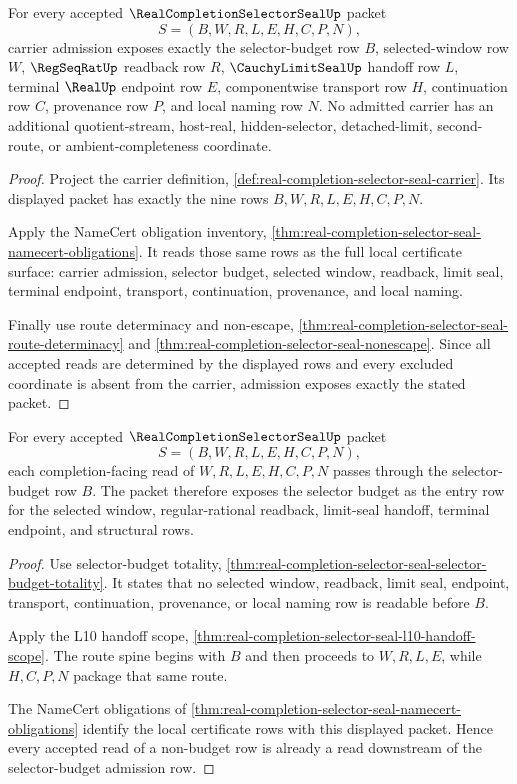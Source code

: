 \begin{theorem}
\label{thm:real-completion-selector-seal-carrier-admission}
For every accepted $\RealCompletionSelectorSealUp$ packet
$$
S=(B,W,R,L,E,H,C,P,N),
$$
carrier admission exposes exactly the selector-budget row $B$, selected-window row $W$, $\RegSeqRatUp$ readback row $R$, $\CauchyLimitSealUp$ handoff row $L$, terminal $\RealUp$ endpoint row $E$, componentwise transport row $H$, continuation row $C$, provenance row $P$, and local naming row $N$. No admitted carrier has an additional quotient-stream, host-real, hidden-selector, detached-limit, second-route, or ambient-completeness coordinate.
\end{theorem}
\begin{proof}
Project the carrier definition, \autoref{def:real-completion-selector-seal-carrier}. Its displayed packet has exactly the nine rows $B,W,R,L,E,H,C,P,N$.

Apply the NameCert obligation inventory, \autoref{thm:real-completion-selector-seal-namecert-obligations}. It reads those same rows as the full local certificate surface: carrier admission, selector budget, selected window, readback, limit seal, terminal endpoint, transport, continuation, provenance, and local naming.

Finally use route determinacy and non-escape, \autoref{thm:real-completion-selector-seal-route-determinacy} and \autoref{thm:real-completion-selector-seal-nonescape}. Since all accepted reads are determined by the displayed rows and every excluded coordinate is absent from the carrier, admission exposes exactly the stated packet.
\end{proof}

\begin{theorem}
\label{thm:real-completion-selector-seal-selector-budget-exposure}
For every accepted $\RealCompletionSelectorSealUp$ packet
$$
S=(B,W,R,L,E,H,C,P,N),
$$
each completion-facing read of $W,R,L,E,H,C,P,N$ passes through the selector-budget row $B$. The packet therefore exposes the selector budget as the entry row for the selected window, regular-rational readback, limit-seal handoff, terminal endpoint, and structural rows.
\end{theorem}
\begin{proof}
Use selector-budget totality, \autoref{thm:real-completion-selector-seal-selector-budget-totality}. It states that no selected window, readback, limit seal, endpoint, transport, continuation, provenance, or local naming row is readable before $B$.

Apply the L10 handoff scope, \autoref{thm:real-completion-selector-seal-l10-handoff-scope}. The route spine begins with $B$ and then proceeds to $W,R,L,E$, while $H,C,P,N$ package that same route.

The NameCert obligations of \autoref{thm:real-completion-selector-seal-namecert-obligations} identify the local certificate rows with this displayed packet. Hence every accepted read of a non-budget row is already a read downstream of the selector-budget admission row.
\end{proof}


